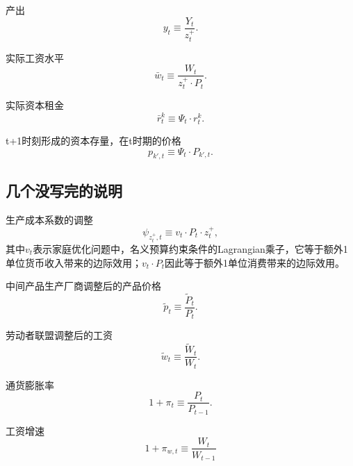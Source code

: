 产出
\begin{equation}
  \label{eq:scaled-product}
  y_t \equiv \frac{Y_t}{z_t^+}.
\end{equation}

实际工资水平
\begin{equation}
  \label{eq:scaled-real-wage}
  \bar{w}_t \equiv \frac{W_t}{z_t^+ \cdot P_t}.
\end{equation}

实际资本租金
\begin{equation}
  \label{eq:real-rental-rate-capital}
  \bar{r}_t^k \equiv \Psi_t \cdot r_t^k.
\end{equation}

t+1时刻形成的资本存量，在t时期的价格
\begin{equation}
  \label{eq:scaled-physical-capital-price}
  p_{k',t} \equiv \Psi_t \cdot P_{k',t}.
\end{equation}

\subsection{几个没写完的说明}

生产成本系数的调整
\begin{equation}
  \label{eq:scaled-produc-cost-adj-coef}
  \psi_{z_t^+, t} \equiv v_t \cdot P_t \cdot z_t^+,
\end{equation}
其中$v_t$表示家庭优化问题中，名义预算约束条件的Lagrangian乘子，它等于额外1单位货币收入带来的边际效用；$v_t \cdot P_t$因此等于额外1单位消费带来的边际效用。

中间产品生产厂商调整后的产品价格
\begin{equation}
  \label{eq:scaled-intm-good-price}
  \tilde{p}_t \equiv \frac{\tilde{P}_t}{P_t}.
\end{equation}

劳动者联盟调整后的工资
\begin{equation}
  \label{eq:scaled-labor-union-price}
  \tilde{w}_t \equiv \frac{\tilde{W}_t}{W_t}.
\end{equation}

通货膨胀率
\begin{equation}
  \label{eq:scaled-price-inflation}
  1+\pi_t \equiv \frac{P_t}{P_{t-1}}.
\end{equation}

工资增速
\begin{equation}
  \label{eq:scaled-wage-inflation}
  1+\pi_{w,t} \equiv \frac{W_t}{W_{t-1}}
\end{equation}


